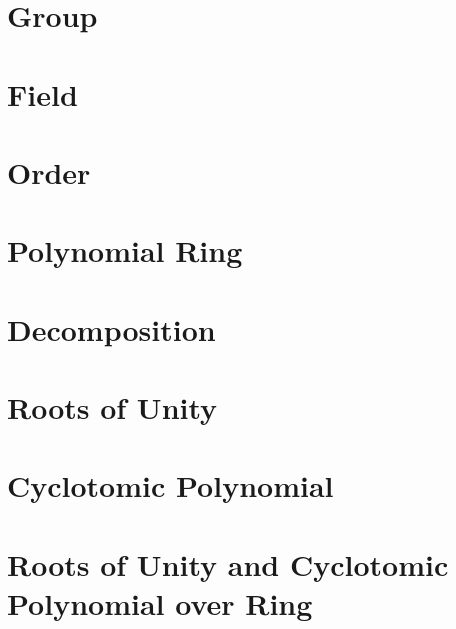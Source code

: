 \documentclass[11pt]{article}
\begin{document}
\clearpage

\section{Group}
\label{sec:group}



\clearpage

\section{Field}
\label{sec:field}


\clearpage

\section{Order}
\label{sec:order}




\clearpage

\section{Polynomial Ring}
\label{sec:polynomial-ring}


\clearpage

\section{Decomposition}
\label{sec:decomp}



\clearpage

\section{Roots of Unity}
\label{sec:roots}


\clearpage

\section{Cyclotomic Polynomial}
\label{sec:cyclotomic}


\clearpage

\section{Roots of Unity and Cyclotomic Polynomial over Ring}
\label{sec:cyclotomic-polynomial-integer-ring}

\end{document}
